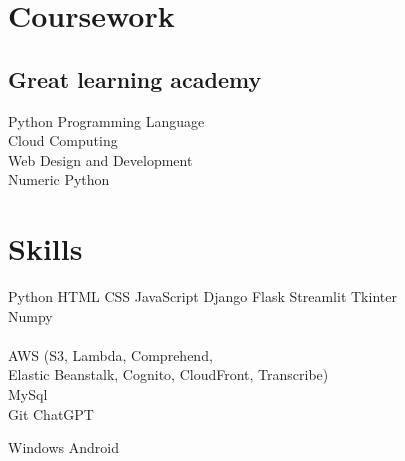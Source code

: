 \documentclass[]{deedy-resume-openfont}
\begin{document}
\begin{minipage}[t]{0.33\textwidth}

\section{Coursework}
\subsection{Great learning academy}
Python Programming Language \\
Cloud Computing \\
Web Design and Development \\
Numeric Python\\
\sectionsep



\section{Skills}
\textbullet{} Python  \textbullet{} HTML  \textbullet{} CSS  \textbullet{} JavaScript 
\textbullet{} Django  \textbullet{} Flask  \textbullet{} Streamlit  \textbullet{} Tkinter\\  \textbullet{} Numpy \\
\\
\textbullet{} AWS (S3, Lambda, Comprehend, \\Elastic Beanstalk, Cognito, CloudFront, Transcribe)\\
\textbullet{} MySql \\
\textbullet{} Git  \textbullet{} ChatGPT \\
\sectionsep

 \textbullet{} Windows \textbullet{} Android 
\sectionsep

%
%

\end{minipage} 
\hfill
\end{document}
